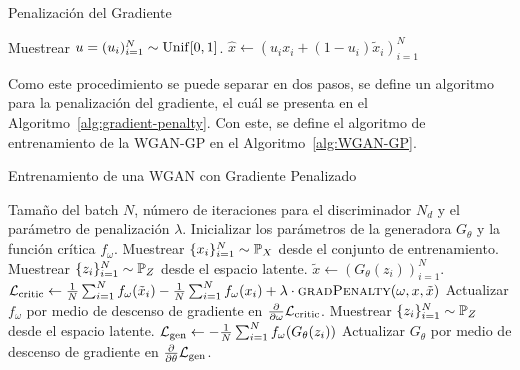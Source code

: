 \begin{algorithm}[H]
    \caption{Penalización del Gradiente}\label{alg:gradient-penalty}
    \begin{algorithmic}[1]
        \State Muestrear $u = (u_i)_{i=1}^N \sim \mathrm{Unif}[0, 1]$.
        \State $\hat x \gets (u_i x_i + (1-u_i) \tilde x_i)_{i=1}^{N}$
        \State {}
        \EndFunction
    \end{algorithmic}
\end{algorithm}

Como este procedimiento se puede separar en dos pasos, se define un algoritmo para la penalización del gradiente, el cuál se presenta en el Algoritmo~\ref{alg:gradient-penalty}. Con este, se define el algoritmo de entrenamiento de la WGAN-GP en el Algoritmo~\ref{alg:WGAN-GP}.

\begin{algorithm}[H]

    \caption{Entrenamiento de una WGAN con Gradiente Penalizado \cite{gulrajani2017improved}}\label{alg:WGAN-GP}

    \begin{algorithmic}[1]
        \Require Tamaño del batch $N$, número de iteraciones para el discriminador $N_d$ y el parámetro de penalización $\lambda$.
        \State Inicializar los parámetros de la generadora $G_\theta$ y la función crítica $f_\omega$.
        \State Muestrear $\{x_i\}_{i=1}^{N} \sim \Prob_X$ desde el conjunto de entrenamiento.
        \State Muestrear $\{z_i\}_{i=1}^{N} \sim \Prob_Z$ desde el espacio latente.
        \State $\tilde x \gets (G_\theta(z_i))_{i=1}^{N}$.
        \State $\cL_{\mathrm{critic}} \gets
            \frac{1}{N} \sum_{i=1}^{N} f_{\omega}(\tilde x_i) - \frac{1}{N} \sum_{i=1}^{N} f_{\omega}(x_i) + \lambda \cdot \Call{gradPenalty}{\omega, x, \tilde x}$
        \State Actualizar $f_{\omega}$ por medio de descenso de gradiente en $\pdv{\omega} \mathcal{L}_{\mathrm{critic}}$.
        \EndFor
        \State Muestrear $\{z_i\}_{i=1}^{N} \sim \Prob_Z$ desde el espacio latente.
        \State $\mathcal{L}_{\mathrm{gen}} \gets - \frac{1}{N}\sum_{i=1}^{N} f_\omega(G_\theta(z_i))$
        \State Actualizar $G_\theta$ por medio de descenso de gradiente en $\pdv{\theta} \mathcal{L}_{\mathrm{gen}}$.
        \EndWhile
    \end{algorithmic}
\end{algorithm}

